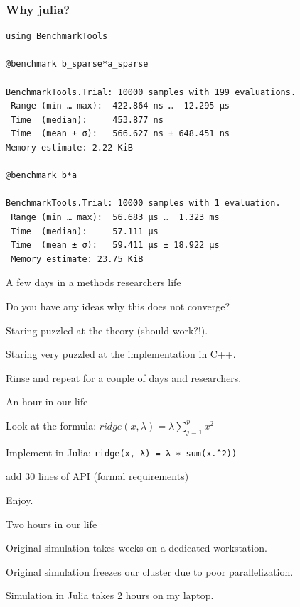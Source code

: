 \documentclass{beamer}
\newcommand{\monob}[1]{\mbox{\texttt{\textcolor{mypurple}{#1}}}}
\newenvironment{wideitemize}{
    \itemize\addtolength{\itemsep}{15pt}\addtolength{\topsep}{10pt}}{\enditemize}
\begin{document}
            \begin{frame}[fragile]
        \frametitle{Why julia?}
        \vspace{0.5cm}
        \begin{lstlisting}[language=JuliaLocal, style=julia,
        basicstyle=\scriptsize\JuliaMonoRegular]
using BenchmarkTools

@benchmark b_sparse*a_sparse

BenchmarkTools.Trial: 10000 samples with 199 evaluations.
 Range (min … max):  422.864 ns …  12.295 μs
 Time  (median):     453.877 ns
 Time  (mean ± σ):   566.627 ns ± 648.451 ns
Memory estimate: 2.22 KiB

@benchmark b*a

BenchmarkTools.Trial: 10000 samples with 1 evaluation.
 Range (min … max):  56.683 μs …  1.323 ms
 Time  (median):     57.111 μs
 Time  (mean ± σ):   59.411 μs ± 18.922 μs
 Memory estimate: 23.75 KiB
\end{lstlisting}
    \end{frame}


    \begin{frame}{A few days in a methods researchers life}
        \begin{wideitemize}
        \item Do you have any ideas why this does not converge?
        \item Staring puzzled at the theory (should work?!).
        \item Staring very puzzled at the implementation in C++.
        \item Rinse and repeat for a couple of days and researchers.
        \end{wideitemize}
    \end{frame}

    \begin{frame}{An hour in our life}
      \begin{wideitemize}
        \item Look at the formula: $ridge(x, \lambda{}) = \lambda{}\sum^p_{j=1}x^2$
        \item Implement in Julia: \monob{ridge(x, λ) = λ ∗ sum(x.\^{}2))}
        \item add 30 lines of API (formal requirements)
        \item Enjoy.
      \end{wideitemize}
    \end{frame}

    \begin{frame}{Two hours in our life}
        \begin{wideitemize}
        \item Original simulation takes weeks on a dedicated workstation.
        \item Original simulation freezes our cluster due to poor parallelization.
        \item Simulation in Julia takes 2 hours on my laptop.
        \end{wideitemize}
    \end{frame}
\end{document}
